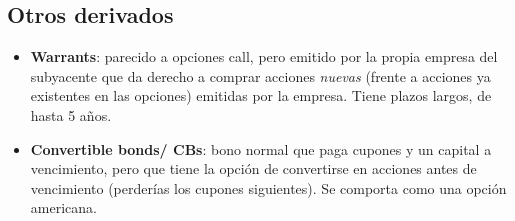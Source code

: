 \subsection{Otros derivados}
\begin{itemize}
    \item \textbf{Warrants}: parecido a opciones call, pero emitido por la propia empresa del subyacente que da derecho a comprar acciones \textit{nuevas} (frente a acciones ya existentes en las opciones) emitidas por la empresa. Tiene plazos largos, de hasta 5 años.
    \item \textbf{Convertible bonds/ CBs}: bono normal que paga cupones y un capital a vencimiento, pero que tiene la opción de convertirse en acciones antes de vencimiento (perderías los cupones siguientes). Se comporta como una opción americana.
\end{itemize}







